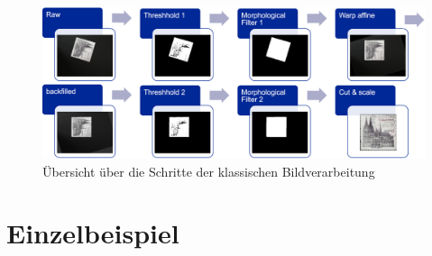 \documentclass[12pt,toc=bib,toc=listof]{scrreprt}
\begin{document}
\begin{figure}[h]
\includegraphics[width=\textwidth]{./../bilder/bv_overview.png}
\caption{Übersicht über die Schritte der klassischen Bildverarbeitung}
\label{fig:bv_overview}
\end{figure}


\section{Einzelbeispiel}
\label{sec_bv:paradebsp}
\end{document}
